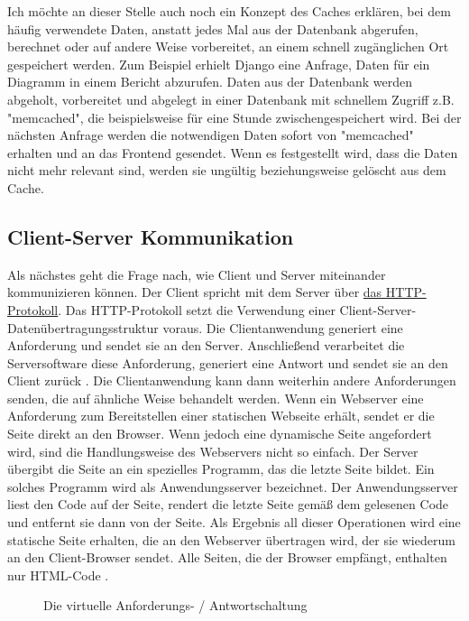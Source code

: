 Ich möchte an dieser Stelle auch noch ein Konzept des Caches erklären, bei dem häufig verwendete Daten, anstatt jedes Mal aus der Datenbank abgerufen, berechnet oder auf andere Weise vorbereitet, an einem schnell zugänglichen Ort gespeichert werden. Zum Beispiel erhielt Django eine Anfrage, Daten für ein Diagramm in einem Bericht abzurufen. Daten aus der Datenbank werden abgeholt, vorbereitet und abgelegt in einer Datenbank mit schnellem Zugriff z.B. "memcached", die beispielsweise für eine Stunde zwischengespeichert wird. Bei der nächsten Anfrage werden die notwendigen Daten sofort von "memcached" erhalten und an das Frontend gesendet. Wenn es festgestellt wird, dass die Daten nicht mehr relevant sind, werden sie ungültig beziehungsweise gelöscht aus dem Cache.

\subsection{Client-Server Kommunikation}
\label{sec:theorie:http}
Als nächstes geht die Frage nach, wie Client und Server miteinander kommunizieren können. Der Client spricht mit dem Server über \hyperref[sec:appendix:http]{das HTTP-Protokoll}. Das HTTP-Protokoll setzt die Verwendung einer Client-Server-Datenübertragungsstruktur voraus. Die Clientanwendung generiert eine Anforderung und sendet sie an den Server. Anschließend verarbeitet die Serversoftware diese Anforderung, generiert eine Antwort und sendet sie an den Client zurück \cite[pp.33-34]{shklar:webapplication}. Die Clientanwendung kann dann weiterhin andere Anforderungen senden, die auf ähnliche Weise behandelt werden. Wenn ein Webserver eine Anforderung zum Bereitstellen einer statischen Webseite erhält, sendet er die Seite direkt an den Browser.\cite{website:2} Wenn jedoch eine dynamische Seite angefordert wird, sind die Handlungsweise des Webservers nicht so einfach. Der Server übergibt die Seite an ein spezielles Programm, das die letzte Seite bildet. Ein solches Programm wird als Anwendungsserver bezeichnet. Der Anwendungsserver liest den Code auf der Seite, rendert die letzte Seite gemäß dem gelesenen Code und entfernt sie dann von der Seite. Als Ergebnis all dieser Operationen wird eine statische Seite erhalten, die an den Webserver übertragen wird, der sie wiederum an den Client-Browser sendet. Alle Seiten, die der Browser empfängt, enthalten nur HTML-Code \cite{website:2}. 
 
\begin{figure}[h!]
	\centering
	\caption{Die virtuelle Anforderungs- / Antwortschaltung}
	\label{fig:http_req}
\end{figure}

